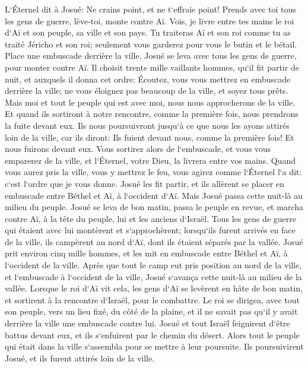 \verse L`Éternel dit à Josué: Ne crains point, et ne t`effraie point! Prends avec toi tous les gens de guerre, lève-toi, monte contre Aï. Vois, je livre entre tes mains le roi d`Aï et son peuple, sa ville et son pays. 
\verse Tu traiteras Aï et son roi comme tu as traité Jéricho et son roi; seulement vous garderez pour vous le butin et le bétail. Place une embuscade derrière la ville. 
\verse Josué se leva avec tous les gens de guerre, pour monter contre Aï. Il choisit trente mille vaillants hommes, qu`il fit partir de nuit, 
\verse et auxquels il donna cet ordre: Écoutez, vous vous mettrez en embuscade derrière la ville; ne vous éloignez pas beaucoup de la ville, et soyez tous prêts. 
\verse Mais moi et tout le peuple qui est avec moi, nous nous approcherons de la ville. Et quand ils sortiront à notre rencontre, comme la première fois, nous prendrons la fuite devant eux. 
\verse Ils nous poursuivront jusqu`à ce que nous les ayons attirés loin de la ville, car ils diront: Ils fuient devant nous, comme la première fois! Et nous fuirons devant eux. 
\verse Vous sortirez alors de l`embuscade, et vous vous emparerez de la ville, et l`Éternel, votre Dieu, la livrera entre vos mains. 
\verse Quand vous aurez pris la ville, vous y mettrez le feu, vous agirez comme l`Éternel l`a dit: c`est l`ordre que je vous donne. 
\verse Josué les fit partir, et ils allèrent se placer en embuscade entre Béthel et Aï, à l`occident d`Aï. Mais Josué passa cette nuit-là au milieu du peuple. 
\verse Josué se leva de bon matin, passa le peuple en revue, et marcha contre Aï, à la tête du peuple, lui et les anciens d`Israël. 
\verse Tous les gens de guerre qui étaient avec lui montèrent et s`approchèrent; lorsqu`ils furent arrivés en face de la ville, ils campèrent au nord d`Aï, dont ils étaient séparés par la vallée. 
\verse Josué prit environ cinq mille hommes, et les mit en embuscade entre Béthel et Aï, à l`occident de la ville. 
\verse Après que tout le camp eut pris position au nord de la ville, et l`embuscade à l`occident de la ville, Josué s`avança cette nuit-là au milieu de la vallée. 
\verse Lorsque le roi d`Aï vit cela, les gens d`Aï se levèrent en hâte de bon matin, et sortirent à la rencontre d`Israël, pour le combattre. Le roi se dirigea, avec tout son peuple, vers un lieu fixé, du côté de la plaine, et il ne savait pas qu`il y avait derrière la ville une embuscade contre lui. 
\verse Josué et tout Israël feignirent d`être battus devant eux, et ils s`enfuirent par le chemin du désert. 
\verse Alors tout le peuple qui était dans la ville s`assembla pour se mettre à leur poursuite. Ils poursuivirent Josué, et ils furent attirés loin de la ville. 
